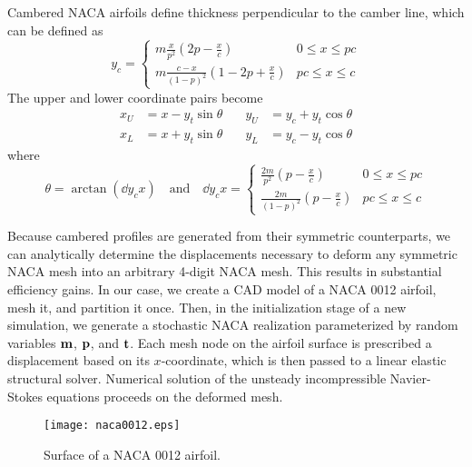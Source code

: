 \documentclass[11pt]{article}
\begin{document}
Cambered NACA airfoils define thickness perpendicular to the camber line, which can be defined as
\begin{equation}
y_c = \begin{cases}
m \frac{x}{p^2} \left( 2p-\frac{x}{c}\right) & 0 \le x \le pc \\
m \frac{c-x}{(1-p)^2} \left(1-2p+\frac{x}{c}\right) & pc \le x \le c
\end{cases}
\end{equation}
The upper and lower coordinate pairs become
\begin{equation}
\begin{aligned}
x_U &= x - y_t \sin \theta &\quad y_U &= y_c + y_t \cos \theta \\
x_L &= x + y_t \sin \theta &\quad y_L &= y_c - y_t \cos \theta
\end{aligned}
\end{equation}
where
\begin{equation}
\theta = \arctan \left( \dd{y_c}{x} \right)
\quad \text{and} \quad
\dd{y_c}{x} =
\begin{cases}
\frac{2m}{p^2} \left( p - \frac{x}{c} \right) & 0 \le x \le pc \\
\frac{2m}{(1-p)^2} \left( p - \frac{x}{c} \right) & pc \le x \le c
\end{cases}
\end{equation}

Because cambered profiles are generated from their symmetric counterparts, we can analytically determine the displacements necessary to deform any symmetric NACA mesh into an arbitrary 4-digit NACA mesh. This results in substantial efficiency gains. In our case, we create a CAD model of a NACA 0012 airfoil, mesh it, and partition it once. Then, in the initialization stage of a new simulation, we generate a stochastic NACA realization parameterized by random variables $\mb{m}$, $\mb{p}$, and $\mb{t}$. Each mesh node on the airfoil surface is prescribed a displacement based on its $x$-coordinate, which is then passed to a linear elastic structural solver. Numerical solution of the unsteady incompressible Navier-Stokes equations proceeds on the deformed mesh.

\begin{figure}[b]
\begin{center}
\texttt{[image: naca0012.eps]}
\vspace{1ex}
\caption{Surface of a NACA 0012 airfoil.}
\label{fig:naca0012}
\end{center}
\end{figure}
\end{document}
